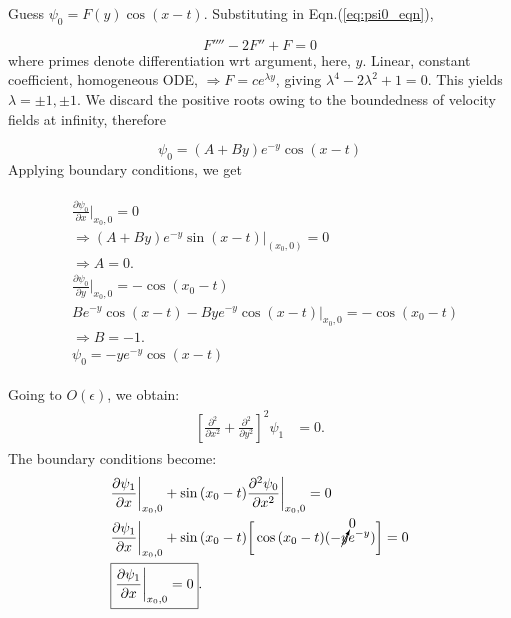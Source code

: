 \documentclass{article}
\begin{document}
Guess $\psi_{0} = F(y)\cos{(x-t)}$. Substituting in Eqn.(\ref{eq:psi0_eqn}),

\begin{equation}\label{eqn:F}
 F'''' - 2F'' + F = 0
\end{equation}
where primes denote differentiation wrt argument, here, $y$. 
Linear, constant coefficient, homogeneous ODE, $\Rightarrow F = c e^{\lambda y}$, giving $\lambda^{4} - 2\lambda^{2} + 1 = 0$. This yields $\lambda = \pm 1, \pm 1$. We discard the positive roots owing to the boundedness of velocity fields at infinity, therefore

\begin{equation}\label{eq:F_form}
 \psi_{0} = (A+By) e^{-y}\cos{(x-t)}
\end{equation}
Applying boundary conditions, we get

\begin{align}
 \begin{split}
  &\frac{\partial \psi_{0}}{\partial x }\bigg|_{x_{0}, 0}  = 0\\
  &\Rightarrow (A+By) e^{-y}\sin{(x-t)} \bigg|_{(x_{0}, 0)} = 0 \\
  &\Rightarrow \boxed{A=0}.\\
  &\frac{\partial \psi_{0}}{\partial y }\bigg|_{x_{0}, 0} = -  \cos{(x_{0} - t)}\\
  &Be^{-y}\cos{(x-t)} - Bye^{-y}\cos{(x-t)}\bigg|_{x_{0}, 0} = -  \cos{(x_{0} - t)}\\
  &\Rightarrow \boxed{B=-1}.\\
  & \boxed{\psi_{0} = -y e^{-y}\cos{(x-t)}}
 \end{split}
\end{align}

Going to $O(\epsilon)$, we obtain:
\begin{align}\label{eq:psi1_eqn}
 \begin{split}
  \left[\frac{\partial^{2}}{\partial x^{2}} + \frac{\partial^{2}}{\partial y^{2}}\right]^{2} \psi_{1} &= 0.
 \end{split}
\end{align}
The boundary conditions become:
\begin{align}\label{eq:psi1_x}
 \begin{split}
 &  \frac{\partial \psi_{1}}{\partial x }\bigg|_{x_{0}, 0} + \sin{(x_{0}-t)} \frac{\partial^{2} \psi_{0}}{\partial x^{2}}\bigg|_{x_{0}, 0}= 0\\
 &  \frac{\partial \psi_{1}}{\partial x }\bigg|_{x_{0}, 0} + \sin{(x_{0}-t)} \bigg[\cos{(x_{0}-t)}(-\cancelto{0}{y}e^{-y}) \bigg] = 0\\
 & \boxed{\frac{\partial \psi_{1}}{\partial x }\bigg|_{x_{0}, 0} = 0}.
 \end{split}
\end{align}
\end{document}
